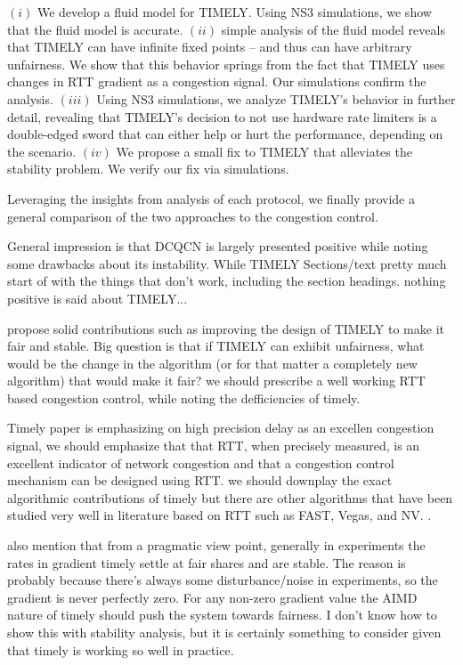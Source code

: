  $(i)$ We develop a fluid model for TIMELY. Using NS3 simulations,
we show that the fluid model is accurate. $(ii)$ simple analysis of the fluid model
reveals that TIMELY can have infinite fixed points -- and thus can have
arbitrary unfairness. We show that this behavior springs from the fact that
TIMELY uses changes in RTT gradient as a congestion signal.
Our simulations confirm the analysis. $(iii)$ Using NS3
simulations, we analyze TIMELY's behavior in further detail, revealing that
TIMELY's decision to not use hardware rate limiters is a double-edged sword that
can either help or hurt the performance, depending on the scenario. $(iv)$ We
propose a small fix to TIMELY that alleviates the stability problem. We verify
our fix via simulations.

Leveraging the insights from analysis of each protocol, we finally provide a
general comparison of the two approaches to the congestion control.

General impression is that DCQCN is largely presented positive while noting some drawbacks about its instability. While TIMELY Sections/text pretty much start of with the things that don't work, including the section headings. nothing positive is said about TIMELY...

propose solid contributions such as improving the design of TIMELY to make it fair and stable. Big question is that if TIMELY can exhibit unfairness, what would be the change in the algorithm (or for that matter a completely new algorithm) that would make it fair? we should prescribe a well working RTT based congestion control, while noting the defficiencies of timely.

Timely paper is emphasizing on high precision delay as an excellen congestion signal, we should emphasize that that RTT, when precisely measured, is an excellent indicator of network congestion and that a congestion control mechanism can be designed using RTT. we should downplay the exact algorithmic contributions of timely but there are other algorithms that have been studied very well in literature based on RTT such as FAST, Vegas, and NV. .

also mention that from a pragmatic view point, generally in experiments the rates in gradient timely settle at fair shares and are stable. The reason is probably because there's always some disturbance/noise in experiments, so the gradient is never perfectly zero. For any non-zero gradient value the AIMD nature of timely should push the system towards fairness. I don't know how to show this with stability analysis, but it is certainly something to consider given that timely is working so well in practice.




